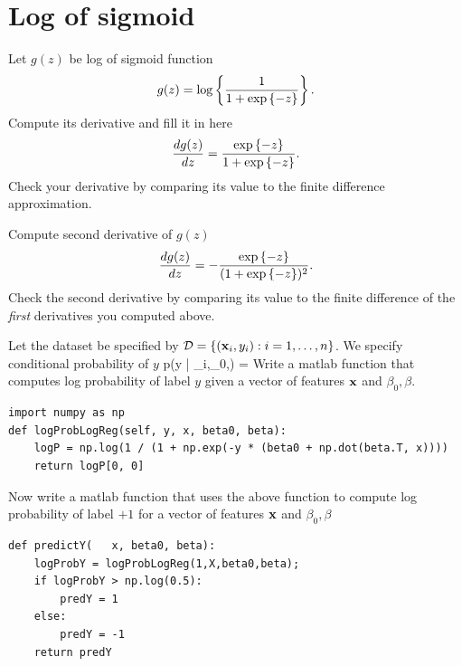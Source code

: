 \documentclass{article}
\begin{document}
\section*{Log of sigmoid}
\newproblem{1pt}
Let $g(z)$ be log of sigmoid function
\[
g(z) = \mathop{\rm log}\left\{ \frac{1}{1+ \mathop{\rm exp}\left\{-z\right\}} \right\}.
\]
Compute its derivative and fill it in here
\[
\frac{dg(z)}{dz} =   \frac{\myexp{-z}}{1 + \myexp{-z}}.%
\]
Check your derivative by comparing its value to the finite difference approximation.


\newproblem{1pt}
Compute second derivative of $g(z)$
\[
\frac{dg(z)}{dz} =  - \frac{\myexp{-z}}{(1 + \myexp{-z})^2}.%
\]
Check the second derivative by comparing its value to the finite difference of the {\em first} derivatives you computed above.


\newproblem{1pt}
Let the dataset be specified by $\mathcal{D} = \left\{ (\mathbf{x}_i,y_i):i=1,\dots,n \right\}$. We specify conditional probability of $y$
\BEQ \label{eq:plr}
p(y | \xx_i,\beta_0,\beta) = 
\EEQ
Write a matlab function that computes log probability of label $y$ given a vector of features $\mathbf{x}$ and $\beta_0,\beta$.
\begin{lstlisting}
import numpy as np
def logProbLogReg(self, y, x, beta0, beta):
	logP = np.log(1 / (1 + np.exp(-y * (beta0 + np.dot(beta.T, x))))
	return logP[0, 0]
\end{lstlisting}
Now write a matlab function that uses the above function to compute log probability of label $+1$ for a vector of features $\mathbf{x}$ and $\beta_0,\beta$
\begin{lstlisting}
def predictY(	x, beta0, beta):
	logProbY = logProbLogReg(1,X,beta0,beta);
	if logProbY > np.log(0.5):
		predY = 1
	else:
		predY = -1
	return predY
\end{lstlisting}
\end{document}
